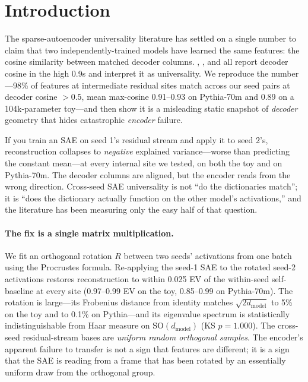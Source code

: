 \documentclass[11pt,letterpaper]{article}
\newcommand{\dmodel}{d_{\mathrm{model}}}
\newcommand{\R}{R}
\begin{document}
\section{Introduction}

The sparse-autoencoder universality literature has settled on a single number to claim that two independently-trained models have learned the same features: the cosine similarity between matched decoder columns. \citet{templeton2024scaling}, \citet{bricken2023monosemanticity}, and \citet{lieberum2024gemma} all report decoder cosine in the high 0.9s and interpret it as universality. We reproduce the number---98\% of features at intermediate residual sites match across our seed pairs at decoder cosine $> 0.5$, mean max-cosine 0.91--0.93 on Pythia-70m and 0.89 on a 104k-parameter toy---and then show it is a misleading static snapshot of \emph{decoder} geometry that hides catastrophic \emph{encoder} failure.

If you train an SAE on seed 1's residual stream and apply it to seed 2's, reconstruction collapses to \emph{negative} explained variance---worse than predicting the constant mean---at every internal site we tested, on both the toy and on Pythia-70m. The decoder columns are aligned, but the encoder reads from the wrong direction. Cross-seed SAE universality is not ``do the dictionaries match''; it is ``does the dictionary actually function on the other model's activations,'' and the literature has been measuring only the easy half of that question.

\paragraph{The fix is a single matrix multiplication.} We fit an orthogonal rotation $\R$ between two seeds' activations from one batch using the Procrustes formula. Re-applying the seed-1 SAE to the rotated seed-2 activations restores reconstruction to within 0.025 EV of the within-seed self-baseline at every site (0.97--0.99 EV on the toy, 0.85--0.99 on Pythia-70m). The rotation is large---its Frobenius distance from identity matches $\sqrt{2\dmodel}$ to 5\% on the toy and to 0.1\% on Pythia---and its eigenvalue spectrum is statistically indistinguishable from Haar measure on $\mathrm{SO}(\dmodel)$ (KS $p = 1.000$). The cross-seed residual-stream bases are \emph{uniform random orthogonal samples}. The encoder's apparent failure to transfer is not a sign that features are different; it is a sign that the SAE is reading from a frame that has been rotated by an essentially uniform draw from the orthogonal group.
\end{document}
